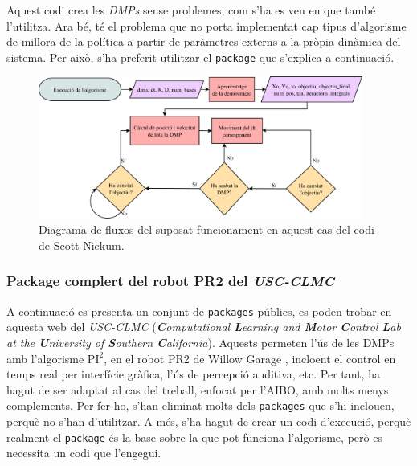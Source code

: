 \documentclass[12pt,a4paper,final,twoside]{article}
\begin{document}
Aquest codi crea les \textit{DMPs} sense problemes, com s'ha es veu en \cite{Pfeiffer2014} que també l'utilitza. Ara bé, té el problema que no porta implementat cap tipus d'algorisme de millora de la política a partir de paràmetres externs a la pròpia dinàmica del sistema. Per això, s'ha preferit utilitzar el \texttt{package} que s'explica a continuació.

\begin{figure}[bt]
\centering
\includegraphics[width=0.95\textwidth]{Imatges/diagrama-sniekum.pdf}
\caption[Diagrama fluxos del codi de Scott Niekum]{Diagrama de fluxos del suposat funcionament en aquest cas del codi de Scott Niekum.}
\label{fig:diagrama-sniekum}
\end{figure}


\subsubsection{Package complert del robot PR2 del \textit{USC-CLMC}}
\label{Package-USC-CLMC}

A continuació es presenta un conjunt de  \texttt{packages} públics, es poden trobar en aquesta web \cite{USC-CLMC-package} del \textit{USC-CLMC} (\textit{\textbf{C}omputational \textbf{L}earning and \textbf{M}otor \textbf{C}ontrol \textbf{L}ab at the \textbf{U}niversity of \textbf{S}outhern \textbf{C}alifornia}). Aquests permeten l'ús de les DMPs amb l'algorisme $\mathrm{PI^2}$, en el robot PR2 de Willow Garage \cite{Bohren2011}, incloent el control en temps real per interfície gràfica, l'ús de percepció auditiva, etc. Per tant, ha hagut de ser adaptat al cas del treball, enfocat per l'AIBO, amb molts menys complements. Per fer-ho, s'han eliminat molts dels \texttt{packages} que s'hi inclouen, perquè no s'han d'utilitzar. A més, s'ha hagut de crear un codi d'execució, perquè realment el \texttt{package} és la base sobre la que pot funciona l'algorisme, però es necessita un codi que l'engegui. 
\end{document}
